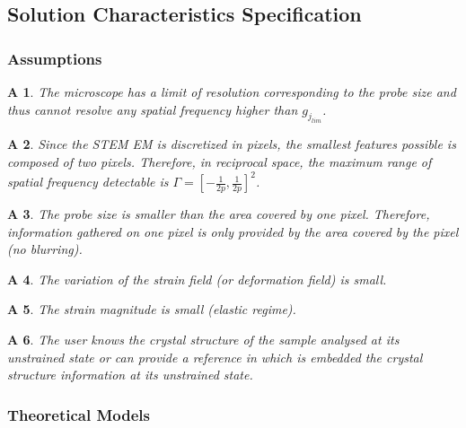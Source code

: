 \documentclass[12pt]{article}
\newtheorem{A}{A}
\begin{document}
\subsection{Solution Characteristics Specification}


\subsubsection{Assumptions}

\begin{A}
\normalfont The microscope has a limit of resolution corresponding to the probe size and thus cannot resolve any spatial frequency higher than $g_{j_{lim}}$. 
\label{A_1}
\end{A}
\begin{A}
\normalfont Since the STEM EM is discretized in pixels, the smallest features possible is composed of two pixels. Therefore, in reciprocal space, the maximum range of spatial frequency detectable is $\Gamma=[-\frac{1}{2p},\frac{1}{2p}]^{2}$.
\label{A_2}
\end{A}
\begin{A}
\normalfont The probe size is smaller than the area covered by one pixel. Therefore, information gathered on one pixel is only provided by the area covered by the pixel (no blurring).
\label{A_3}
\end{A}
\begin{A}
\normalfont The variation of the strain field (or deformation field) is small.
\label{A_4}
\end{A}
\begin{A}
\normalfont The strain magnitude is small (elastic regime).
\end{A}
\begin{A}
\normalfont The user knows the crystal structure of the sample analysed at its unstrained state or can provide a reference in which is embedded the crystal structure information at its unstrained state.
\label{A_6}
\end{A}

\subsubsection{Theoretical Models}\label{sec_theoretical}
\end{document}
